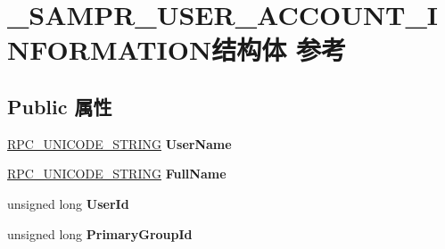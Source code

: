 \hypertarget{struct___s_a_m_p_r___u_s_e_r___a_c_c_o_u_n_t___i_n_f_o_r_m_a_t_i_o_n}{}\section{\+\_\+\+S\+A\+M\+P\+R\+\_\+\+U\+S\+E\+R\+\_\+\+A\+C\+C\+O\+U\+N\+T\+\_\+\+I\+N\+F\+O\+R\+M\+A\+T\+I\+O\+N结构体 参考}
\label{struct___s_a_m_p_r___u_s_e_r___a_c_c_o_u_n_t___i_n_f_o_r_m_a_t_i_o_n}
\subsection*{Public 属性}
\begin{DoxyCompactItemize}
\item 
\mbox{\label{struct___s_a_m_p_r___u_s_e_r___a_c_c_o_u_n_t___i_n_f_o_r_m_a_t_i_o_n_add6edadb09f022e943747bda8853cf0a}} 
\hyperlink{struct___r_p_c___u_n_i_c_o_d_e___s_t_r_i_n_g}{R\+P\+C\+\_\+\+U\+N\+I\+C\+O\+D\+E\+\_\+\+S\+T\+R\+I\+NG} {\bfseries User\+Name}
\item 
\mbox{\label{struct___s_a_m_p_r___u_s_e_r___a_c_c_o_u_n_t___i_n_f_o_r_m_a_t_i_o_n_a02d8ca30c6a78716e3aea5cbb3ecbb5f}} 
\hyperlink{struct___r_p_c___u_n_i_c_o_d_e___s_t_r_i_n_g}{R\+P\+C\+\_\+\+U\+N\+I\+C\+O\+D\+E\+\_\+\+S\+T\+R\+I\+NG} {\bfseries Full\+Name}
\item 
\mbox{\label{struct___s_a_m_p_r___u_s_e_r___a_c_c_o_u_n_t___i_n_f_o_r_m_a_t_i_o_n_aaa9a6b2bcfd24da4b90b08ad0396db97}} 
unsigned long {\bfseries User\+Id}
\item 
\mbox{\label{struct___s_a_m_p_r___u_s_e_r___a_c_c_o_u_n_t___i_n_f_o_r_m_a_t_i_o_n_ae0ec7c580fd1f260c1ae0919e36fca1d}} 
unsigned long {\bfseries Primary\+Group\+Id}
\item 
\mbox{\label{struct___s_a_m_p_r___u_s_e_r___a_c_c_o_u_n_t___i_n_f_o_r_m_a_t_i_o_n_abfa9df56d3af3d1e7449554d9ea7d16a}} 

\end{DoxyCompactItemize}
